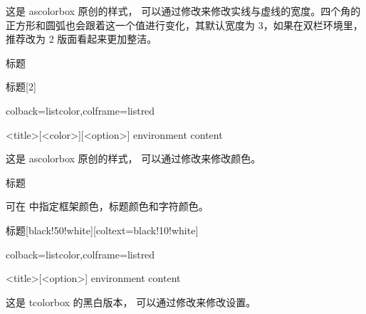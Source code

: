 \documentclass[fontset=none]{ctexart}
\begin{document}
	这是 ascolorbox 原创的样式，  可以通过修改来修改实线与虚线的宽度。四个角的正方形和圆弧也会跟着这一个值进行变化，其默认宽度为 3，如果在双栏环境里，推荐改为 2 版面看起来更加整洁。
	
	\begin{dispExample}
		\begin{ascolorbox4}[子标题]{标题}
			\zhlipsum[1]
		\end{ascolorbox4}
	\end{dispExample}
	
	\begin{dispExample}
		\begin{ascolorbox4}[子标题]{标题}[2]
			\zhlipsum[1]
		\end{ascolorbox4}
	\end{dispExample}
	
	
	
	\begin{dispListing*}{colback=listcolor,colframe=listred}
		\begin{ascolorbox5}[<subtitle>]{<title>}[<color>][<option>]
			environment content
		\end{ascolorbox5}
	\end{dispListing*}
	
	这是 ascolorbox 原创的样式，  可以通过修改来修改颜色。
	
	\begin{dispExample}
		\begin{ascolorbox5}[子标题]{标题}
			\zhlipsum[1]
		\end{ascolorbox5}
	\end{dispExample}
	
	可在  中指定框架颜色，标题颜色和字符颜色。
	
	\begin{dispExample}
		\begin{ascolorbox5}[子标题]{标题}[black!50!white][coltext=black!10!white]
			\zhlipsum[1]
		\end{ascolorbox5}
	\end{dispExample}
	
	
	\begin{dispListing*}{colback=listcolor,colframe=listred}
		\begin{ascolorbox8}{<title>}[<option>]
			environment content
		\end{ascolorbox8}
	\end{dispListing*}
	
	这是 tcolorbox 的黑白版本，  可以通过修改来修改设置。
	
\end{document}
